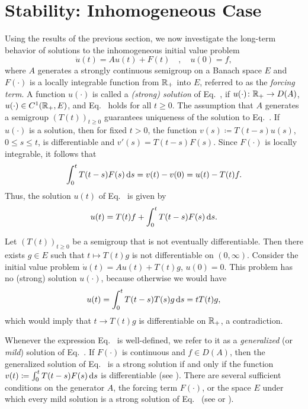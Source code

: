 \section{Stability: Inhomogeneous Case}\label{sec:a4-2}
Using the results of the previous section, we now investigate the long-term behavior of solutions to the inhomogeneous initial value
problem
\begin{equation}\label{eq:a4-2.1}
\dot{u}(t) = Au(t) + F(t) \quad , \quad u(0) = f,
\end{equation}
where $A$ generates a strongly continuous semigroup on a
Banach space $ E $ and $F(\cdot)$ is a locally integrable function from $\mathbb{R}_{+}$
into $ E $, referred to as the \emph{forcing term}. 
A function $u(\cdot)$ is called a \emph{(strong) solution} of Eq.~, if\/ $u(\cdot) \colon \mathbb{R}_{+} \to D(A)$, 
$u(\cdot) \in C^{1}(\mathbb{R}_{+},E)$, and Eq.~ holds for all $t \geq 0$.
The assumption that $A$ generates a semigroup $(T(t))_{t \geq 0}$
guarantees uniqueness of the solution to Eq.~. 
If\/ $u(\cdot)$ is a solution, then for fixed $t>0$, the function $v(s) \coloneq  T(t-s)u(s)$, $0 \leq s \leq t$, is
differentiable and $v'(s) = T(t-s)F(s)$. 
Since $F(\cdot)$ is locally integrable, it follows that 
\[
\int_{0}^{t} T(t-s)F(s)  \mathop{}\!\mathrm{d}{s} = v(t) - v(0) = u(t) - T(t)f.
\]
Thus, the solution $u(t)$ of Eq.~ is given by
\begin{equation}\label{eq:a4-2.2}
u(t) = T(t)f + \int_{0}^{t} T(t-s)F(s)  \mathop{}\!\mathrm{d}{s} .
\end{equation}

\begin{example*} \label{ex:a4-2.1}
Let $(T(t))_{t \geq 0}$ be a semigroup that is not eventually differentiable. 
Then there
exists $g \in E$ such that $t \mapsto T(t)g$ is not differentiable on $(0,\infty)$.
Consider the initial value problem $\dot{u}(t) = Au(t) + T(t)g$, $u(0) = 0$. This problem has no
(strong) solution $u(\cdot)$, because otherwise we would have 
\begin{align*}
u(t) = \int_{0}^{t} T(t-s)T(s)g  \mathop{}\!\mathrm{d}{s} = tT(t)g,
\end{align*}
which would imply that $t\to T(t)g$ is 
differentiable on $\mathbb{R}_{+}$, a contradiction. 
\end{example*}


Whenever the expression Eq.~ is well-defined, we refer to it as a  \emph{generalized} (or
\emph{mild}) solution of Eq.~. 
If\/ $F(\cdot)$ is continuous and $f \in D(A)$, then
the generalized solution of Eq.~ is a strong solution if and only if the function 
$v(t) \coloneq  \int_{0}^{t} T(t-s)F(s)  \mathop{}\!\mathrm{d}{s}$ is differentiable (see \textcite[Chapter~4, 2.4]{pazy:1983}). 
There are several sufficient conditions on the generator $A$,
the forcing term $F(\cdot)$, or the space $E$ under which every mild solution
is a strong solution of Eq.~ (see \textcite{travis:1981}
or  \textcite[Section~4.2]{pazy:1983}).

